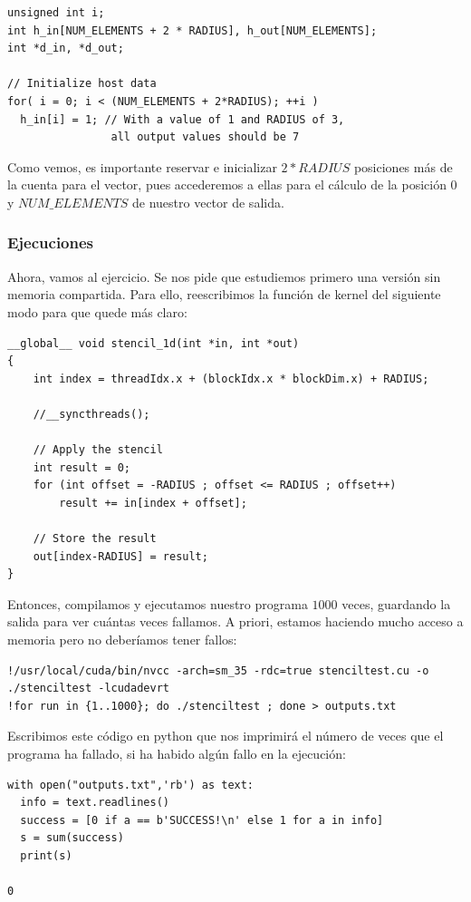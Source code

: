 \documentclass[11pt]{article}
\theoremstyle{plain}
\begin{document}
\begin{verbatim}
unsigned int i;
int h_in[NUM_ELEMENTS + 2 * RADIUS], h_out[NUM_ELEMENTS];
int *d_in, *d_out;

// Initialize host data
for( i = 0; i < (NUM_ELEMENTS + 2*RADIUS); ++i )
  h_in[i] = 1; // With a value of 1 and RADIUS of 3,
 				all output values should be 7
\end{verbatim}
Como vemos, es importante reservar e inicializar $2*RADIUS$ posiciones más de la cuenta para el vector, pues accederemos a ellas para el cálculo de la posición $0$ y $NUM\_ELEMENTS$ de nuestro vector de salida.

\subsubsection{Ejecuciones}



Ahora, vamos al ejercicio. Se nos pide que estudiemos primero una versión sin memoria compartida. Para ello, reescribimos la función de kernel del siguiente modo para que quede más claro:
\begin{verbatim}
__global__ void stencil_1d(int *in, int *out)
{
    int index = threadIdx.x + (blockIdx.x * blockDim.x) + RADIUS;

    //__syncthreads();

    // Apply the stencil
    int result = 0;
    for (int offset = -RADIUS ; offset <= RADIUS ; offset++)
        result += in[index + offset];

    // Store the result
    out[index-RADIUS] = result;
}
\end{verbatim}

Entonces, compilamos y ejecutamos nuestro programa $1000$ veces, guardando la salida para ver cuántas veces fallamos. A priori, estamos haciendo mucho acceso a memoria pero no deberíamos tener fallos:
\begin{verbatim}
!/usr/local/cuda/bin/nvcc -arch=sm_35 -rdc=true stenciltest.cu -o ./stenciltest -lcudadevrt
!for run in {1..1000}; do ./stenciltest ; done > outputs.txt
\end{verbatim}

Escribimos este código en python que nos imprimirá el número de veces que el programa ha fallado, si ha habido algún fallo en la ejecución:
\begin{verbatim}
with open("outputs.txt",'rb') as text:
  info = text.readlines()
  success = [0 if a == b'SUCCESS!\n' else 1 for a in info]
  s = sum(success)
  print(s)

0
\end{verbatim}
\end{document}
